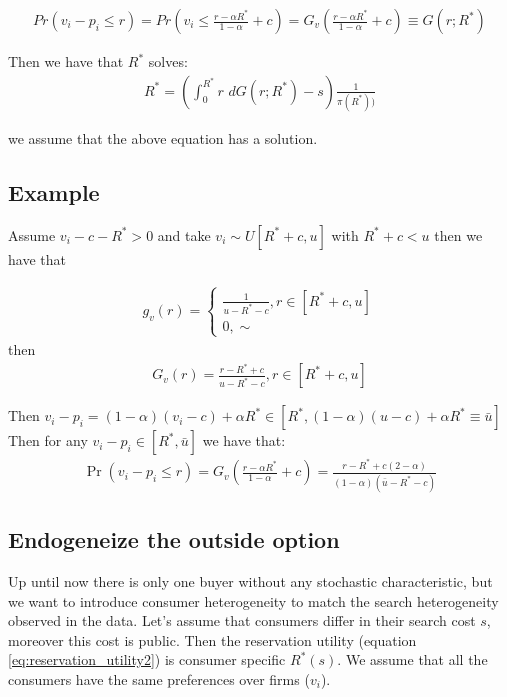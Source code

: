 \documentclass[12pt]{article}
\theoremstyle{plain}
\theoremstyle{plain}
\begin{document}
\begin{align*}
    Pr(v_i-p_i\leq r) = Pr\left(v_i \leq \frac{r-\alpha R^*}{1-\alpha}+c\right)= G_v\left( \frac{r-\alpha R^*}{1-\alpha}+c\right) \equiv G(r; R^*)
\end{align*}


Then we have that $R^*$ solves: 
\begin{align}\label{eq:reservation_utility2}
        R^* = \left( \int_0^{R^*} r \, \, dG(r; R^*) -s\right)\frac{1}{\pi(R^*))} 
\end{align}

we assume that the above equation has a solution.


\subsection{Example}

Assume $v_i - c - R^*>0$ and take $v_i \sim U[R^*+c, u]$ with $R^*+c< u$ then we have that 

\begin{align}
    g_v(r) = 
    \begin{cases}
        \frac{1}{u-R^*-c}, r\in [R^*+c, u]\\ 
        0, \sim 
    \end{cases}
\end{align}
then
\begin{align}
    G_v(r) =  
        \frac{r-R^*+c}{u-R^*-c}, r\in [R^*+c, u]
\end{align}

Then $v_i - p_i = (1-\alpha)(v_i -c) +\alpha R^* \in [R^*, (1-\alpha)(u-c)+ \alpha R^*  \equiv \bar{u}] $
Then for any $v_i - p_i  \in [R^*, \bar{u}] $ we have that: 
\begin{align}
    \Pr(v_i - p_i\leq r) = G_v\left(\frac{r-\alpha R^*}{1-\alpha} +c\right) = \frac{r-R^*+c(2-\alpha)}{(1-\alpha)(\bar{u}-R^*-c)}
\end{align}



\subsection{Endogeneize the outside option}

Up until now there is only one buyer without any stochastic characteristic, but we want to introduce consumer heterogeneity to match the search heterogeneity observed in the data. Let's assume that consumers differ in their search cost $s$, moreover this cost is public. Then the reservation utility (equation \ref{eq:reservation_utility2}) is consumer specific $R^*(s)$. We assume that all the consumers have the same preferences over firms ($v_i$). 
\end{document}

